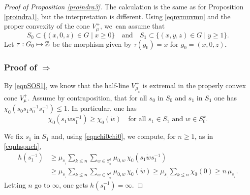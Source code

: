 \documentclass[JEP,XML,SOM,Unicode]{cedram}
\def\mto{\mathchoice{\longmapsto}{\mapsto}{\mapsto}{\mapsto}}
\theoremstyle{definition}
\newcommand{\m}[1]{\mathbb{ #1}}
\begin{document}
\begin{proof}[Proof of Proposition \ref{proindra3}]
The calculation is the same as for Proposition \ref{proindra1},
but the interpretation is different.
Using \eqref{eqnvmuvmu} and the proper convexity of the cone $V_\mu^+$,
we~can assume that\vspace*{-3pt}
\begin{equation}
\label{eqnSOS1}
S_0\subset \{ (x,0,z)\in G\mid x\geq 0\}
\quad\text{and}\quad
S_1\subset \{ (x,y,z)\in G\mid y\geq 1\}.
\end{equation}
Let $\tau:G_0\mto \m Z$ be the morphism given by
$\tau(g_0)=x$ for $g_0=(x,0,z)$.

\subsubsection*{Proof of $\Rightarrow$}
By \eqref{eqnSOS1}, we know that the half-line $V^+_{\mu_{_0}}$ is extremal
in the properly convex cone $V^+_\mu$.
Assume by contraposition, that
for all $s_0$ in $S_0$ and $s_1$ in $S_1$
one has $\chi_0(s_0s_1s_0^{-1}s_1^{-1})\leq 1$.
In particular, one has\vspace*{-3pt}
\begin{equation}
\label{eqnchi0chi0}
\chi_0(s_1\dot{w}s_1^{-1})
\geq \chi_0(\dot{w})
\quad\text{for all $s_1\in S_1$ and $w\in S_0^k$.}
\end{equation}

We fix $s_1$ in $S_1$ and, using \eqref{eqnchi0chi0}, we compute, for $n\geq 1$, as in \eqref{eqnhspnch},\vspace*{-3pt}
\begin{align*}
h(s_1^{-1})
&\geq
\mu_{s_{_1}}\sum_{k\leq n}
\sum_{w\in S_{_0}^k}\mu_{0,w}\,\chi_0(s_1\dot{w}s_1^{-1})\\[-3pt]
&\geq
\mu_{s_{_1}}\sum_{k\leq n}
\sum_{w\in S_{_0}^k}\mu_{0,w}\,\chi_0(\dot{w})\geq
\mu_{s_{_1}}\sum_{k\leq n}\chi_0(0)
\geq n\, \mu_{s_{_1}}.
\end{align*}
Letting $n$ go to $\infty$, one gets
$h(s_1^{-1})=\infty$.


\end{proof}
\end{document}
